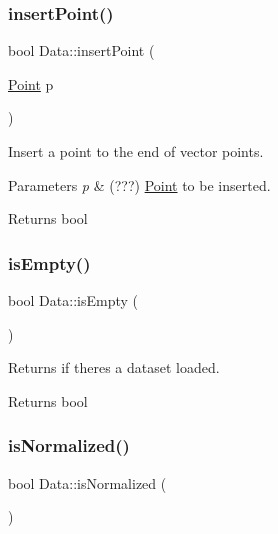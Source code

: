 \subsubsection{\texorpdfstring{insert\+Point()}{insertPoint()}\hspace{0.1cm}{\footnotesize\ttfamily [2/2]}}
{\footnotesize\ttfamily bool Data\+::insert\+Point (\begin{DoxyParamCaption}\item[{\hyperlink{class_point}{Point}}]{p }\end{DoxyParamCaption})}



Insert a point to the end of vector points. 


\begin{DoxyParams}{Parameters}
{\em p} & (???) \hyperlink{class_point}{Point} to be inserted. \\
\hline
\end{DoxyParams}
\begin{DoxyReturn}{Returns}
bool 
\end{DoxyReturn}
\mbox{\label{class_data_a93468d3b8b2ce0f73e369e5de160534e}} 
\subsubsection{\texorpdfstring{is\+Empty()}{isEmpty()}}
{\footnotesize\ttfamily bool Data\+::is\+Empty (\begin{DoxyParamCaption}{ }\end{DoxyParamCaption})}



Returns if there\textquotesingle{}s a dataset loaded. 

\begin{DoxyReturn}{Returns}
bool 
\end{DoxyReturn}
\mbox{\label{class_data_ad96fc8e9c5ec9e40b1dc6d9670eefe0c}} 
\subsubsection{\texorpdfstring{is\+Normalized()}{isNormalized()}}
{\footnotesize\ttfamily bool Data\+::is\+Normalized (\begin{DoxyParamCaption}{ }\end{DoxyParamCaption})}



